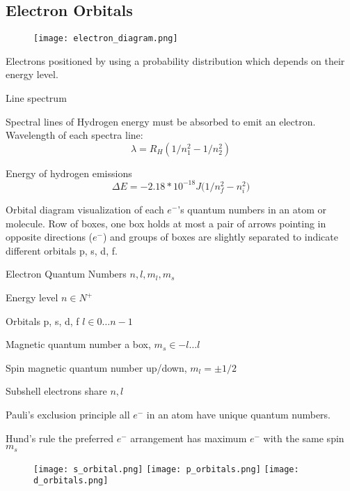 \begin{mdframed}
\begin{multicols}{2}
\subsection{Electron Orbitals}

\begin{figure}[H]
    \texttt{[image: electron\_diagram.png]}
\end{figure}
\begin{compactdesc}
\item[Electrons positioned] by using a probability distribution which depends on
    their energy level.
\item[Line spectrum]
\item[Spectral lines of Hydrogen] energy must be absorbed to emit an electron.
    Wavelength of each spectra line:
    \[
        \lambda = R_H(1/n_1^2 - 1/n_2^2)
    \]
\item[Energy of hydrogen emissions]
    \[
        \Delta E = -2.18*10^{-18}J \big(1/n_f^2 -n_i^2 \big)
    \]
\item[Orbital diagram] visualization of each $e^-$'s quantum numbers in an
    atom or molecule. Row of boxes, one box holds at most a pair of arrows
    pointing in opposite directions ($e^-$) and groups of boxes are slightly
    separated to indicate different orbitals p, s, d, f.
\item[Electron Quantum Numbers] $n, l, m_l, m_s$
\item[Energy level] $n \in N^+$
\item[Orbitals] p, s, d, f $l \in 0\dots n - 1$
\item[Magnetic quantum number] a box, $m_s \in -l \dots l$
\item[Spin magnetic quantum number] up/down, $m_l = \pm 1/2$
\item[Subshell] electrons share $n, l$
\item[Pauli's exclusion principle] all $e^-$ in an atom have unique quantum
    numbers.
\item[Hund's rule] the preferred $e^-$ arrangement has maximum $e^-$ with the
    same spin $m_s$
\end{compactdesc}

\begin{figure}[H]
    \centering
    \texttt{[image: s\_orbital.png]}
    \texttt{[image: p\_orbitals.png]}
    \texttt{[image: d\_orbitals.png]}
\end{figure}

\end{multicols}
\end{mdframed}



